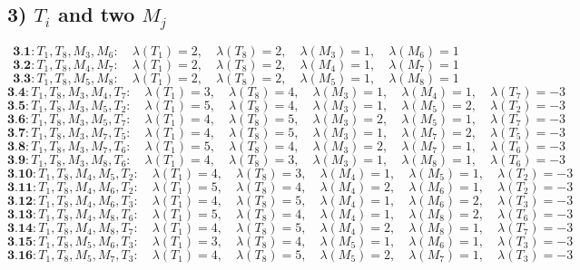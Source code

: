 \documentclass[12p]{article}
\numberwithin{equation}{section}
\begin{document}
\subsection*{3) $T_i$ and two $M_j$}
\[
\textbf{3.1}: T_1, T_8, M_3, M_6:\quad \lambda(T_1) = 2,\quad \lambda(T_8) = 2,\quad \lambda(M_3) = 1,\quad \lambda(M_6) = 1
\]
\[
\textbf{3.2}: T_1, T_8, M_4, M_7:\quad \lambda(T_1) = 2,\quad \lambda(T_8) = 2,\quad \lambda(M_4) = 1,\quad \lambda(M_7) = 1
\]
\[
\textbf{3.3}: T_1, T_8, M_5, M_8:\quad \lambda(T_1) = 2,\quad \lambda(T_8) = 2,\quad \lambda(M_5) = 1,\quad \lambda(M_8) = 1
\]
\[
\textbf{3.4}: T_1, T_8, M_3, M_4, T_7:\quad \lambda(T_1) = 3,\quad \lambda(T_8) = 4,\quad \lambda(M_3) = 1,\quad \lambda(M_4) = 1,\quad \lambda(T_7) = -3
\]
\[
\textbf{3.5}: T_1, T_8, M_3, M_5, T_2:\quad \lambda(T_1) = 5,\quad \lambda(T_8) = 4,\quad \lambda(M_3) = 1,\quad \lambda(M_5) = 2,\quad \lambda(T_2) = -3
\]
\[
\textbf{3.6}: T_1, T_8, M_3, M_5, T_7:\quad \lambda(T_1) = 4,\quad \lambda(T_8) = 5,\quad \lambda(M_3) = 2,\quad \lambda(M_5) = 1,\quad \lambda(T_7) = -3
\]
\[
\textbf{3.7}: T_1, T_8, M_3, M_7, T_5:\quad \lambda(T_1) = 4,\quad \lambda(T_8) = 5,\quad \lambda(M_3) = 1,\quad \lambda(M_7) = 2,\quad \lambda(T_5) = -3
\]
\[
\textbf{3.8}: T_1, T_8, M_3, M_7, T_6:\quad \lambda(T_1) = 5,\quad \lambda(T_8) = 4,\quad \lambda(M_3) = 2,\quad \lambda(M_7) = 1,\quad \lambda(T_6) = -3
\]
\[
\textbf{3.9}: T_1, T_8, M_3, M_8, T_6:\quad \lambda(T_1) = 4,\quad \lambda(T_8) = 3,\quad \lambda(M_3) = 1,\quad \lambda(M_8) = 1,\quad \lambda(T_6) = -3
\]
\[
\textbf{3.10}: T_1, T_8, M_4, M_5, T_2:\quad \lambda(T_1) = 4,\quad \lambda(T_8) = 3,\quad \lambda(M_4) = 1,\quad \lambda(M_5) = 1,\quad \lambda(T_2) = -3
\]
\[
\textbf{3.11}: T_1, T_8, M_4, M_6, T_2:\quad \lambda(T_1) = 5,\quad \lambda(T_8) = 4,\quad \lambda(M_4) = 2,\quad \lambda(M_6) = 1,\quad \lambda(T_2) = -3
\]
\[
\textbf{3.12}: T_1, T_8, M_4, M_6, T_3:\quad \lambda(T_1) = 4,\quad \lambda(T_8) = 5,\quad \lambda(M_4) = 1,\quad \lambda(M_6) = 2,\quad \lambda(T_3) = -3
\]
\[
\textbf{3.13}: T_1, T_8, M_4, M_8, T_6:\quad \lambda(T_1) = 5,\quad \lambda(T_8) = 4,\quad \lambda(M_4) = 1,\quad \lambda(M_8) = 2,\quad \lambda(T_6) = -3
\]
\[
\textbf{3.14}: T_1, T_8, M_4, M_8, T_7:\quad \lambda(T_1) = 4,\quad \lambda(T_8) = 5,\quad \lambda(M_4) = 2,\quad \lambda(M_8) = 1,\quad \lambda(T_7) = -3
\]
\[
\textbf{3.15}: T_1, T_8, M_5, M_6, T_3:\quad \lambda(T_1) = 3,\quad \lambda(T_8) = 4,\quad \lambda(M_5) = 1,\quad \lambda(M_6) = 1,\quad \lambda(T_3) = -3
\]
\[
\textbf{3.16}: T_1, T_8, M_5, M_7, T_3:\quad \lambda(T_1) = 4,\quad \lambda(T_8) = 5,\quad \lambda(M_5) = 2,\quad \lambda(M_7) = 1,\quad \lambda(T_3) = -3
\]
\end{document}
